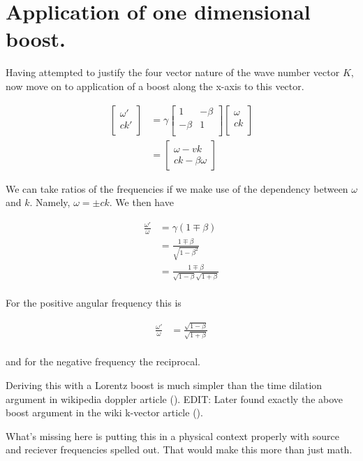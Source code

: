 \section{Application of one dimensional boost.}

Having attempted to justify the four vector nature of the wave number vector $K$, now move on to application of a boost along the x-axis to this vector.

\begin{align*}
\begin{bmatrix}
\omega' \\
c k' \\
\end{bmatrix}
&=
\gamma
\begin{bmatrix}
1 & -\beta \\
-\beta& 1 \\
\end{bmatrix}
\begin{bmatrix}
\omega \\
c k \\
\end{bmatrix} 
\\
&=
\begin{bmatrix}
\omega - v k \\
c k - \beta \omega
\end{bmatrix} 
\end{align*}

We can take ratios of the frequencies if we make use of the dependency between $\omega$ and $k$.  Namely, $\omega = \pm c k$.  We then have

\begin{align*}
\frac{\omega'}{\omega}
&= \gamma(1 \mp \beta) \\
&= \frac{1 \mp \beta}{\sqrt{1 - \beta^2}} \\
&= \frac{1 \mp \beta}{\sqrt{1 - \beta}\sqrt{1 + \beta}} \\
\end{align*}

For the positive angular frequency this is

\begin{align*}
\frac{\omega'}{\omega}
&= \frac{\sqrt{1 - \beta}}{\sqrt{1 + \beta}} 
\\
\end{align*}

and for the negative frequency the reciprocal.

Deriving this with a Lorentz boost is much simpler than the time dilation argument in wikipedia doppler article (\cite{wiki:relDoppler}).  EDIT: Later found exactly the above boost argument in the wiki k-vector article (\cite{wiki:kvector}).

What's missing here is putting this in a physical context properly with source and reciever frequencies spelled out.  That would make this more than just math.

\EndArticle
